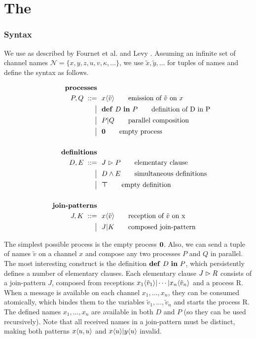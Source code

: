 \section{The \JoinCalc}

\subsubsection{Syntax}

We use \joincalc as described by Fournet et al.
\cite{fournet_calculus_1996} and Levy \cite{levy_results_1997}.
Assuming an infinite set of channel names
$ \mathcal{N} = \{ x, y, z, u, v, \kappa, \ldots \} $,
we use
$ \tilde{x}, \tilde{y}, \ldots $
for tuples of names
and define the syntax as follows.

\begin{align}
  \tag*{\textbf{processes}}
  \\
  P, Q
  \grmr \jsnd{x}{\tilde{v}}   \tag*{emission of $\tilde{v}$ on $x$}
  \altn \nonumber \jdef{D}{P} \tag*{definition of D in P}
  \altn P \jpar Q             \tag*{parallel composition}
  \altn \jnullproc            \tag*{empty process}
  \\ \nonumber
  \\
  \tag*{\textbf{definitions}}
  \\
  D, E
  \grmr \jrct{J}{P} \tag*{elementary clause}
  \altn D \jcon E   \tag*{simultaneous definitions}
  \altn \jnulldef   \tag*{empty definition}
  \\ \nonumber
  \\
  \tag*{\textbf{join-patterns}}
  \\
  J, K
  \grmr \jrcv{x}{\tilde{v}} \tag*{reception of $\tilde{v}$ on x}
  \altn J \jpat K           \tag*{composed join-pattern}
\end{align}

The simplest possible process is the empty process $\textbf{\textup{0}}$.
Also, we can send a tuple of names $\tilde{v}$ on a channel $x$
and compose any two processes $P$ and $Q$ in parallel.
The most interesting construct is the definition $\textbf{\textup{def}} \ D \ \textbf{\textup{in}} \ P$,
which persistently defines a number of elementary clauses.
Each elementary clause $J \vartriangleright R$ consists of
a join-pattern $J$,
composed from receptions
$x_1\langle\tilde{v}_1\rangle | \cdots | x_n\langle\tilde{v}_n\rangle$
and a process R.
When a message is available on each channel $x_1, \ldots, x_n$,
they can be consumed atomically,
which bindes them to the variables $\tilde{v}_1, \ldots, \tilde{v}_n$
and starts the process R.
The defined names $x_1, \ldots, x_n$ are available in both $D$ and $P$
(so they can be used recursively).
Note that all received names in a join-pattern must be distinct,
making both patterns
$ x\langle u,u\rangle $ and
$ x\langle u\rangle | y\langle u\rangle $
invalid.

